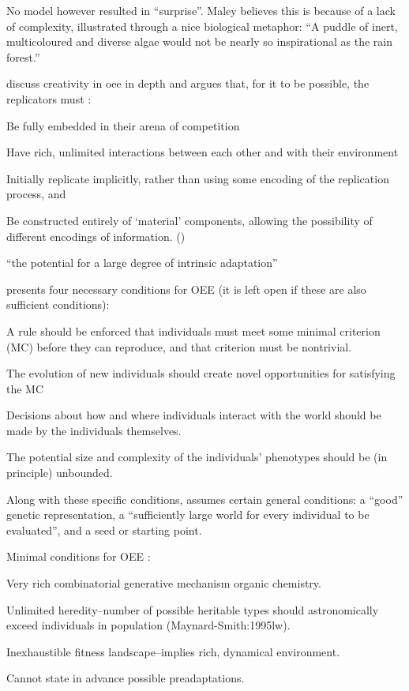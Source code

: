 \begin{NOTES}
No model however resulted in ``surprise''. Maley believes this is because of a lack of complexity, illustrated through a nice biological metaphor: ``A puddle of inert, multicoloured and diverse algae would not be nearly so inspirational as the rain forest.''



\Textcite{Taylor2001,Taylor:1999sc} discuss creativity in \gls{oee} in depth and argues that, for it to be possible, the replicators must \parencite{Hutton2004}:
\begin{compactenum}
	\item Be fully embedded in their arena of competition 
	\item Have rich, unlimited interactions between each other and with their environment 
	\item Initially replicate implicitly, rather than using some encoding of the replication process, and 
	\item Be constructed entirely of `material' components, allowing the possibility of different encodings of information. ()
\end{compactenum}

``the potential for a large degree of intrinsic adaptation'' \parencite{Taylor2001}

\parencite{Soros2014} presents four necessary conditions for OEE (it is left open if these are also sufficient conditions):
\begin{compactenum}
	\item A rule should be enforced that individuals must meet some minimal criterion (MC) before they can reproduce, and that criterion must be nontrivial.
	\item The evolution of new individuals should create novel opportunities for satisfying the MC
	\item Decisions about how and where individuals interact with the world should be made by the individuals themselves.
	\item The potential size and complexity of the individuals' phenotypes should be (in principle) unbounded.
\end{compactenum}
Along with these specific conditions, \parencite{Soros2014} assumes certain general conditions: a ``good'' genetic representation, a ``sufficiently large world for every individual to be evaluated'', and a seed or starting point.

Minimal conditions for OEE \parencite{Vasas2015}:
\begin{compactenum}
	\item Very rich combinatorial generative mechanism \eg organic chemistry.
	\item Unlimited heredity--number of possible heritable types should astronomically exceed individuals in population (Maynard-Smith:1995lw).
	\item Inexhaustible fitness landscape--implies rich, dynamical environment.
	\item Cannot state in advance possible preadaptations.
\end{compactenum}


\end{NOTES}
